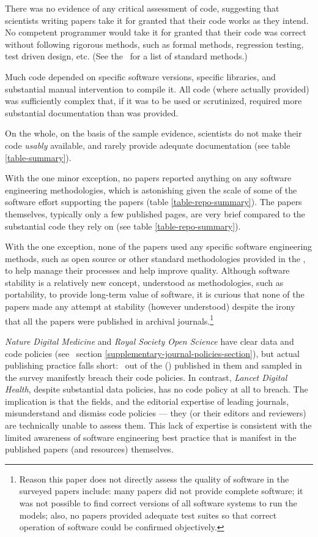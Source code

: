 There was no evidence of any critical assessment of code, suggesting that scientists writing papers take it for granted that their code works as they intend. No competent programmer would take it for granted that their code was correct without following rigorous methods, such as formal methods, regression testing, test driven design, etc. (See the \supplement\ for a list of standard methods.)

Much code depended on specific software versions, specific libraries, and substantial manual intervention to compile it. All code (where actually provided) was sufficiently complex that, if it was to be used or scrutinized, required more substantial documentation than was provided.

On the whole, on the basis of the sample evidence, scientists do not make their code \emph{usably\/} available, and rarely provide adequate documentation (see table \ref{table-summary}). 

With the one minor exception, no papers reported anything on any software engineering methodologies, which is astonishing given the scale of some of the software effort supporting the papers (table \ref{table-repo-summary}).  The papers themselves, typically only a few published pages, are very brief compared to the substantial code they rely on (see table \ref{table-repo-summary}). 

With the one exception, none of the papers used any specific software engineering methods, such as open source \cite{open-source} or other standard methodologies provided in the \supplement, to help manage their processes and help improve quality. Although software stability \cite{stability} is a relatively new concept, understood as methodologies, such as portability, to provide long-term value of software, it is curious that none of the papers made any attempt at stability (however understood) despite the irony that all the papers were published in archival journals.\footnote{Reason this paper does not directly assess the quality of software in the surveyed papers include: many papers did not provide complete software; it was not possible to find correct versions of all software systems to run the models; also, no papers provided adequate test suites so that correct operation of software could be confirmed objectively.}

\emph{Nature Digital Medicine\/} and \emph{Royal Society Open Science\/} have clear data and code policies (see \supplement\ section \ref{supplementary-journal-policies-section}), but actual publishing practice falls short: \the\countHasBreach\ out of the  (\pc{\countHasBreach}{\countHasPolicy}) published in them and sampled in the survey manifestly breach their code policies. In contrast, \emph{Lancet Digital Health\/}, despite substantial data policies, has no code policy at all to breach. The implication is that the fields, and the editorial expertise of leading journals, misunderstand and dismiss code policies --- they (or their editors and reviewers) are technically unable to assess them. This lack of expertise is consistent with the limited awareness of software engineering best practice that is manifest in the published papers (and resources) themselves.

